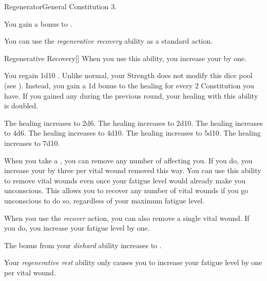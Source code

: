     \begin{feat}{Regenerator}{General}
        \featpre Constitution 3.

         You gain a  bonus to .

         You can use the \textit{regenerative recovery} ability as a standard action.
        \begin{activeability}{Regenerative Recovery}[]
            \rankline
            When you use this ability, you increase your  by one.

            You regain 1d10 \add {} .
            Unlike normal, your Strength does not modify this dice pool (see ).
            Instead, you gain a \plus1d bonus to the healing for every 2 Constitution you have.
            If you gained any  during the previous round, your healing with this ability is doubled.

            \rankline
             The healing increases to 2d6.
             The healing increases to 2d10.
             The healing increases to 4d6.
             The healing increases to 4d10.
             The healing increases to 5d10.
             The healing increases to 7d10.
        \end{activeability}

         When you take a , you can remove any number of  affecting you.
        If you do, you increase your  by three per vital wound removed this way.
        You can use this ability to remove vital wounds even once your fatigue level would already make you unconscious.
        This allows you to recover any number of vital wounds if you go unconscious to do so, regardless of your maximum fatigue level.

         When you use the \textit{recover} action, you can also remove a single vital wound.
        If you do, you increase your fatigue level by one.

         The bonus from your \textit{diehard} ability increases to .

         Your \textit{regenerative rest} ability only causes you to increase your fatigue level by one per vital wound.
    \end{feat}


